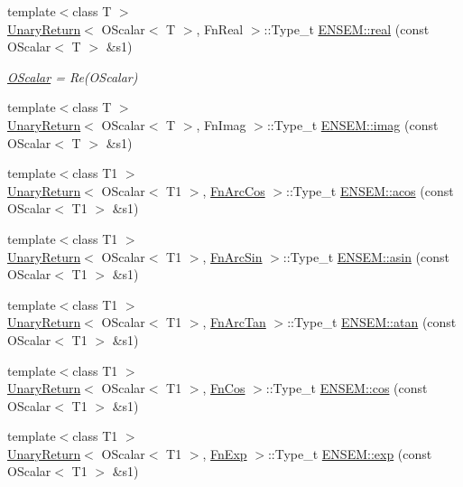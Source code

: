 \begin{DoxyCompactItemize}
{\footnotesize template$<$class T $>$ }\\\mbox{\hyperlink{structUnaryReturn}{Unary\+Return}}$<$ O\+Scalar$<$ T $>$, Fn\+Real $>$\+::Type\+\_\+t \mbox{\hyperlink{group__obsscalar_gaad780424129e881b69f2435599861fb2}{E\+N\+S\+E\+M\+::real}} (const O\+Scalar$<$ T $>$ \&s1)
\begin{DoxyCompactList}\small\item\em \mbox{\hyperlink{classENSEM_1_1OScalar}{O\+Scalar}} = Re(\+O\+Scalar) \end{DoxyCompactList}\item 
{\footnotesize template$<$class T $>$ }\\\mbox{\hyperlink{structUnaryReturn}{Unary\+Return}}$<$ O\+Scalar$<$ T $>$, Fn\+Imag $>$\+::Type\+\_\+t \mbox{\hyperlink{group__obsscalar_ga5c386e541e4c92b380ed34d5a27a6b13}{E\+N\+S\+E\+M\+::imag}} (const O\+Scalar$<$ T $>$ \&s1)
\item 
{\footnotesize template$<$class T1 $>$ }\\\mbox{\hyperlink{structUnaryReturn}{Unary\+Return}}$<$ O\+Scalar$<$ T1 $>$, \mbox{\hyperlink{structFnArcCos}{Fn\+Arc\+Cos}} $>$\+::Type\+\_\+t \mbox{\hyperlink{group__obsscalar_ga734866f3eb39843cc901768dff4f6283}{E\+N\+S\+E\+M\+::acos}} (const O\+Scalar$<$ T1 $>$ \&s1)
\item 
{\footnotesize template$<$class T1 $>$ }\\\mbox{\hyperlink{structUnaryReturn}{Unary\+Return}}$<$ O\+Scalar$<$ T1 $>$, \mbox{\hyperlink{structFnArcSin}{Fn\+Arc\+Sin}} $>$\+::Type\+\_\+t \mbox{\hyperlink{group__obsscalar_gac74c6933e6f290335c2ec508825d5fbb}{E\+N\+S\+E\+M\+::asin}} (const O\+Scalar$<$ T1 $>$ \&s1)
\item 
{\footnotesize template$<$class T1 $>$ }\\\mbox{\hyperlink{structUnaryReturn}{Unary\+Return}}$<$ O\+Scalar$<$ T1 $>$, \mbox{\hyperlink{structFnArcTan}{Fn\+Arc\+Tan}} $>$\+::Type\+\_\+t \mbox{\hyperlink{group__obsscalar_ga785cb0a8ba60f6a9a1f4494b5ac2533d}{E\+N\+S\+E\+M\+::atan}} (const O\+Scalar$<$ T1 $>$ \&s1)
\item 
{\footnotesize template$<$class T1 $>$ }\\\mbox{\hyperlink{structUnaryReturn}{Unary\+Return}}$<$ O\+Scalar$<$ T1 $>$, \mbox{\hyperlink{structFnCos}{Fn\+Cos}} $>$\+::Type\+\_\+t \mbox{\hyperlink{group__obsscalar_gab03cd6386bf0623d4effce724af5c124}{E\+N\+S\+E\+M\+::cos}} (const O\+Scalar$<$ T1 $>$ \&s1)
\item 
{\footnotesize template$<$class T1 $>$ }\\\mbox{\hyperlink{structUnaryReturn}{Unary\+Return}}$<$ O\+Scalar$<$ T1 $>$, \mbox{\hyperlink{structFnExp}{Fn\+Exp}} $>$\+::Type\+\_\+t \mbox{\hyperlink{group__obsscalar_ga9d0d193a9c41dfb71083e25b3fdc6a01}{E\+N\+S\+E\+M\+::exp}} (const O\+Scalar$<$ T1 $>$ \&s1)

\end{DoxyCompactItemize}
